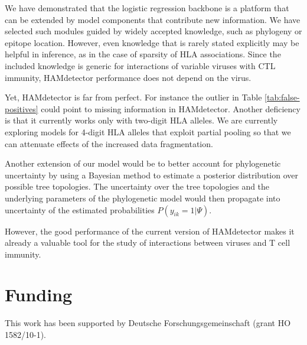 \documentclass{bioinfo}
\begin{document}
We have demonstrated that the logistic regression backbone is a platform that can be extended by model components that contribute new information. We have selected such modules guided by widely accepted knowledge, such as phylogeny or epitope location. However, even knowledge that is rarely stated explicitly may be helpful in inference, as in the case of sparsity of HLA associations. Since the included knowledge is generic for interactions of variable viruses with CTL immunity, HAMdetector performance does not depend on the virus.

Yet, HAMdetector is far from perfect. For instance the outlier in Table \ref{tab:false-positives} could point to missing information in HAMdetector. Another deficiency is that it currently works only with two-digit HLA alleles. We are currently exploring models for 4-digit HLA alleles that exploit partial pooling so that we can attenuate effects of the increased data fragmentation.

Another extension of our model would be to better account for phylogenetic uncertainty by using a Bayesian method to estimate a posterior distribution over possible tree topologies. The uncertainty over the tree topologies and the underlying parameters of the phylogenetic model would then propagate into uncertainty of the estimated probabilities \(P(y_{ik}=1|\Psi)\).

However, the good performance of the current version of HAMdetector makes it already a valuable tool for the study of interactions between viruses and T cell immunity.

%
%











\section*{Funding}

This work has been supported by Deutsche Forschungsgemeinschaft (grant HO 1582/10-1).\vspace*{-12pt}


%
%
%
%
%
%
%

\end{document}
